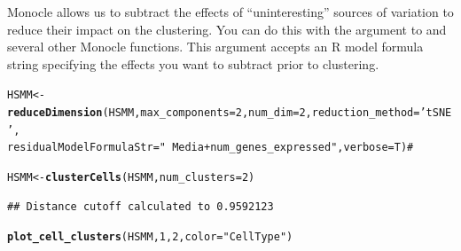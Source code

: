 \documentclass[10pt,oneside]{article}\usepackage[]{graphicx}\usepackage[]{color}
\makeatletter
\newcommand{\hlnum}[1]{\textcolor[rgb]{0.686,0.059,0.569}{#1}}%
\newcommand{\hlstr}[1]{\textcolor[rgb]{0.192,0.494,0.8}{#1}}%
\newcommand{\hlcom}[1]{\textcolor[rgb]{0.678,0.584,0.686}{\textit{#1}}}%
\newcommand{\hlstd}[1]{\textcolor[rgb]{0.345,0.345,0.345}{#1}}%
\newcommand{\hlkwb}[1]{\textcolor[rgb]{0.69,0.353,0.396}{#1}}%
\newcommand{\hlkwc}[1]{\textcolor[rgb]{0.333,0.667,0.333}{#1}}%
\newcommand{\hlkwd}[1]{\textcolor[rgb]{0.737,0.353,0.396}{\textbf{#1}}}%
\newenvironment{kframe}{%
 \def\at@end@of@kframe{}%
 \ifinner\ifhmode%
  \def\at@end@of@kframe{\end{minipage}}%
  \begin{minipage}{\columnwidth}%
 \fi\fi%
 \def\FrameCommand##1{\hskip\@totalleftmargin \hskip-\fboxsep
 \colorbox{shadecolor}{##1}\hskip-\fboxsep
     \hskip-\linewidth \hskip-\@totalleftmargin \hskip\columnwidth}%
 \MakeFramed {\advance\hsize-\width
   \@totalleftmargin\z@ \linewidth\hsize
   \@setminipage}}%
 {\par\unskip\endMakeFramed%
 \at@end@of@kframe}
\newenvironment{knitrout}{}{} %
\makeatother
\begin{document}
Monocle allows us to subtract the effects of ``uninteresting'' sources of variation to reduce their impact on the clustering. You can do this with the  argument to  and several other Monocle functions. This argument accepts an R model formula string specifying the effects you want to subtract prior to clustering.

\begin{knitrout}
\color{fgcolor}\begin{kframe}
\begin{alltt}
\hlstd{HSMM} \hlkwb{<-} \hlkwd{reduceDimension}\hlstd{(HSMM,} \hlkwc{max_components}\hlstd{=}\hlnum{2}\hlstd{,} \hlkwc{num_dim} \hlstd{=} \hlnum{2}\hlstd{,} \hlkwc{reduction_method} \hlstd{=} \hlstr{'tSNE'}\hlstd{,}
                       \hlkwc{residualModelFormulaStr}\hlstd{=}\hlstr{"~Media + num_genes_expressed"}\hlstd{,} \hlkwc{verbose} \hlstd{= T)} \hlcom{#}
\end{alltt}


{\ttfamily\noindent\itshape\color{messagecolor}{\#\# Removing batch effects}}

{\ttfamily\noindent\itshape\color{messagecolor}{\#\# Remove noise by PCA ...}}

{\ttfamily\noindent\itshape\color{messagecolor}{\#\# Reduce dimension by tSNE ...}}\begin{alltt}
\hlstd{HSMM} \hlkwb{<-} \hlkwd{clusterCells}\hlstd{(HSMM,} \hlkwc{num_clusters}\hlstd{=}\hlnum{2}\hlstd{)}
\end{alltt}
\begin{verbatim}
## Distance cutoff calculated to 0.9592123
\end{verbatim}


{\ttfamily\noindent\itshape\color{messagecolor}{\#\# the length of the distance: 34191}}\begin{alltt}
\hlkwd{plot_cell_clusters}\hlstd{(HSMM,} \hlnum{1}\hlstd{,} \hlnum{2}\hlstd{,} \hlkwc{color}\hlstd{=}\hlstr{"CellType"}\hlstd{)}
\end{alltt}
\end{kframe}


\end{knitrout}
\end{document}
